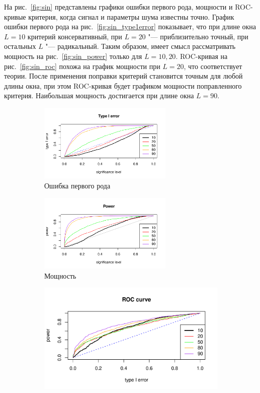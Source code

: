 \documentclass[specialist,
substylefile = spbu_report.rtx,
subf,href,colorlinks=true, 12pt]{disser}
\theoremstyle{definition}
\begin{document}
На рис.~\ref{fig:sin} представлены графики ошибки первого рода, мощности и ROC-кривые критерия, когда сигнал и параметры шума известны точно. График ошибки первого рода на рис.~\ref{fig:sin_type1error} показывает, что при длине окна $L=10$ критерий консервативный, при $L=20$ "--- приблизительно точный, при остальных $L$ "--- радикальный. Таким образом, имеет смысл рассматривать мощность на рис.~\ref{fig:sin_power} только для $L=10,20$. ROC-кривая на рис.~\ref{fig:sin_roc} похожа на график мощности при $L=20$, что соответствует теории. После применения поправки критерий становится точным для любой длины окна, при этом ROC-кривая будет графиком мощности поправленного критерия. Наибольшая мощность достигается при длине окна $L=90$.
\begin{figure}[h]
	\captionsetup[subfigure]{justification=Centering}
	\begin{subfigure}[t]{\textwidth}
		\centering
		\includegraphics[width=0.7\textwidth]{img/type1error_sin_est_noise.pdf}
		\caption{Ошибка первого рода}
		\label{fig:sin_est_noise_type1error}
	\end{subfigure}
	\begin{subfigure}[t]{\textwidth}
		\centering
		\includegraphics[width=0.7\textwidth]{img/power_sin_est_noise.pdf}
		\caption{Мощность}
		\label{fig:sin_est_noise_power}
	\end{subfigure}
	\begin{subfigure}[t]{\textwidth}
		\centering
		\includegraphics[width=0.7\linewidth]{img/roc_sin_est_noise.pdf}

\end{subfigure}
\end{figure}
\end{document}

